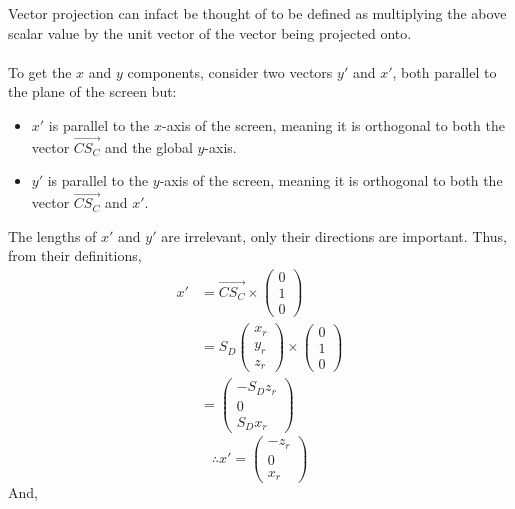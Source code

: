 \documentclass{article}
\newcommand\xp{x\prime\xspace}
\newcommand\yp{y\prime\xspace}
\begin{document}
	Vector projection can infact be thought of to be defined as multiplying the above scalar value by the unit vector of the vector being projected onto.
	\paragraph{}
	To get the $x$ and $y$ components, consider two vectors $\yp$ and $\xp$, both parallel to the plane of the screen but:
	\begin{itemize}
		\item $\xp$ is parallel to the $x$-axis of the screen, meaning it is orthogonal to both the vector $\overrightarrow{C S_C}$ and the global $y$-axis.
		\item $\yp$ is parallel to the $y$-axis of the screen, meaning it is orthogonal to both the vector $\overrightarrow{C S_C}$ and $\xp$.

	\end{itemize}
	The lengths of $\xp$ and $\yp$ are irrelevant, only their directions are important. Thus, from their definitions,
	\begin{align*}
			\xp & = \overrightarrow{C S_C} \times \begin{pmatrix} 0\\1\\0 \end{pmatrix}\\
			     & = S_D \begin{pmatrix}x_r\\y_r\\z_r\end{pmatrix} \times \begin{pmatrix} 0\\1\\0 \end{pmatrix}\\
			    & = \begin{pmatrix} -S_D z_r\\ 0\\ S_D x_r \end{pmatrix}
	\end{align*}
	\begin{equation}
		\therefore \xp = \begin{pmatrix} -z_r \\0 \\x_r\end{pmatrix}
	\end{equation}
	And,
\end{document}
